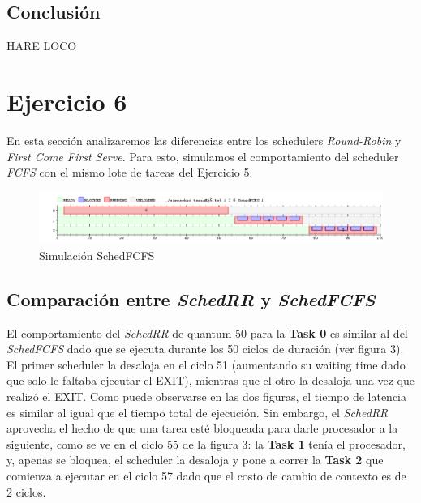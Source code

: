 \documentclass[11pt]{article}
\begin{document}
\subsection{Conclusión}
HARE LOCO

\newpage

\section{Ejercicio 6}

En esta sección analizaremos las diferencias entre los schedulers \textit{Round-Robin} y \textit{First Come First Serve}. Para esto, simulamos el comportamiento del scheduler \textit{FCFS} con el mismo lote de tareas del Ejercicio 5.

      \begin{figure}[H]
        \includegraphics[scale=0.5]{Ej6}
        \caption{Simulación SchedFCFS}
      \end{figure}

\subsection{Comparación entre \textit{SchedRR} y \textit{SchedFCFS}}

El comportamiento del \textit{SchedRR} de quantum 50 para la \textbf{Task 0} es similar al del \textit{SchedFCFS} dado que se ejecuta durante los 50 ciclos de duración (ver figura 3). El primer scheduler la desaloja en el ciclo 51 (aumentando su waiting time dado que solo le faltaba ejecutar el EXIT), mientras que el otro la desaloja una vez que realizó el EXIT. Como puede observarse en las dos figuras, el tiempo de latencia es similar al igual que el tiempo total de ejecución. Sin embargo, el \textit{SchedRR} aprovecha el hecho de que una tarea esté bloqueada para darle procesador a la siguiente, como se ve en el ciclo 55 de la figura 3: la \textbf{Task 1} tenía el procesador, y, apenas se bloquea, el scheduler la desaloja y pone a correr la \textbf{Task 2} que comienza a ejecutar en el ciclo 57 dado que el costo de cambio de contexto es de 2 ciclos. \\
\end{document}

